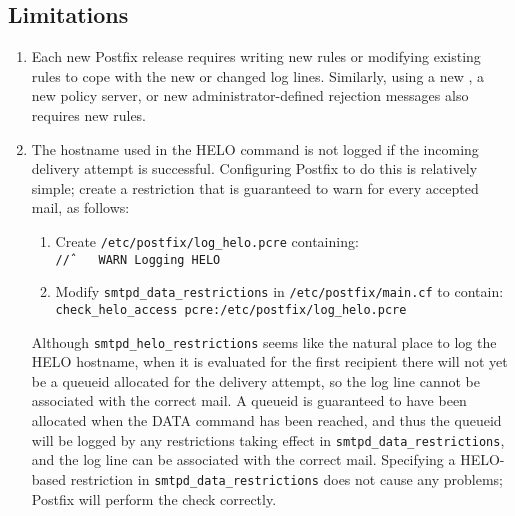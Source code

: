 \subsection{Limitations}

\label{logging helo}

\begin{enumerate}

    \item Each new Postfix release requires writing new rules or modifying
        existing rules to cope with the new or changed log lines.
        Similarly, using a new , a new policy server, or new
        administrator-defined rejection messages also requires new rules.

    \item The hostname used in the HELO command is not logged if the
        incoming delivery attempt is successful.  Configuring Postfix to do
        this is relatively simple; create a restriction that is guaranteed
        to warn for every accepted mail, as follows:

        \begin{enumerate}

            \item Create \texttt{/etc/postfix/log\_helo.pcre}
                containing:\newline{}
                \tab{}\texttt{/\^/~~~~WARN~Logging~HELO}

            \item Modify \texttt{smtpd\_data\_restrictions} in
                \texttt{/etc/postfix/main.cf} to contain:\newline{}
                \tab{}\texttt{check\_helo\_access~pcre:/etc/postfix/log\_helo.pcre}

        \end{enumerate}

        Although \texttt{smtpd\_helo\_restrictions} seems like the natural
        place to log the HELO hostname, when it is evaluated for the first
        recipient there will not yet be a queueid allocated for the
        delivery attempt, so the log line cannot be associated with the
        correct mail.  A queueid is guaranteed to have been allocated when
        the DATA command has been reached, and thus the queueid will be
        logged by any restrictions taking effect in
        \texttt{smtpd\_data\_restrictions}, and the log line can be
        associated with the correct mail.  Specifying a HELO-based
        restriction in \texttt{smtpd\_data\_restrictions} does not cause
        any problems; Postfix will perform the check correctly.


\end{enumerate}
